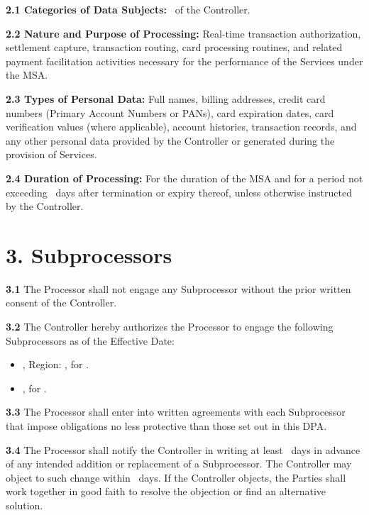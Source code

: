 \documentclass[11pt]{article}
\begin{document}
\textbf{2.1 Categories of Data Subjects:} \DataSubjectCategories\ of the Controller.

\textbf{2.2 Nature and Purpose of Processing:} Real-time transaction authorization,
settlement capture, transaction routing, card processing routines, and related payment
facilitation activities necessary for the performance of the Services under the MSA.

\textbf{2.3 Types of Personal Data:} Full names, billing addresses, credit card numbers
(Primary Account Numbers or PANs), card expiration dates, card verification values (where
applicable), account histories, transaction records, and any other personal data provided
by the Controller or generated during the provision of Services.

\textbf{2.4 Duration of Processing:} For the duration of the MSA and for a period not
exceeding \PostTerminationRetentionDays\ days after termination or expiry thereof, unless
otherwise instructed by the Controller.

\section*{3. Subprocessors}
\textbf{3.1} The Processor shall not engage any Subprocessor without the prior written
consent of the Controller.

\textbf{3.2} The Controller hereby authorizes the Processor to engage the following
Subprocessors as of the Effective Date:
\begin{itemize}[leftmargin=2em]
  \item \SubprocessorOneName, Region: \SubprocessorOneRegion, for \SubprocessorOnePurpose.
  \item \SubprocessorTwoName, for \SubprocessorTwoPurpose.
\end{itemize}

\textbf{3.3} The Processor shall enter into written agreements with each Subprocessor that
impose obligations no less protective than those set out in this DPA.

\textbf{3.4} The Processor shall notify the Controller in writing at least
\SubprocessorNoticeDays\ days in advance of any intended addition or replacement of a
Subprocessor. The Controller may object to such change within \SubprocessorObjectionDays\
days. If the Controller objects, the Parties shall work together in good faith to resolve
the objection or find an alternative solution.
\end{document}
